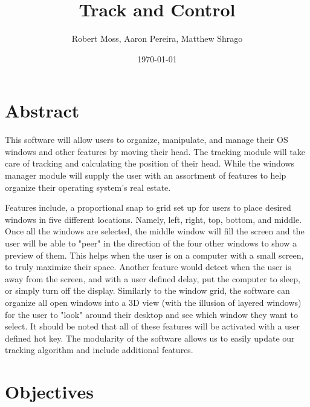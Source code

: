 \documentclass[12pt]{article}
\title{Track and Control}
\author{Robert Moss, Aaron Pereira, Matthew Shrago}
\date{\today}
\begin{document}
\maketitle

\section{Abstract}

This software will allow users to organize, manipulate, and manage their OS windows and other features by moving their head. The tracking module will take care of tracking and calculating the position of their head. While the windows manager module will supply the user with an assortment of features to help organize their operating system's real estate.

Features include, a proportional snap to grid set up for users to place desired windows in five different locations. Namely, left, right, top, bottom, and middle. Once all the windows are selected, the middle window will fill the screen and the user will be able to "peer" in the direction of the four other windows to show a preview of them. This helps when the user is on a computer with a small screen, to truly maximize their space. Another feature would detect when the user is away from the screen, and with a user defined delay, put the computer to sleep, or simply turn off the display. Similarly to the window grid, the software can organize all open windows into a 3D view (with the illusion of layered windows) for the user to "look" around their desktop and see which window they want to select. It should be noted that all of these features will be activated with a user defined hot key. The modularity of the software allows us to easily update our tracking algorithm and include additional features.


\section{Objectives}
\end{document}
